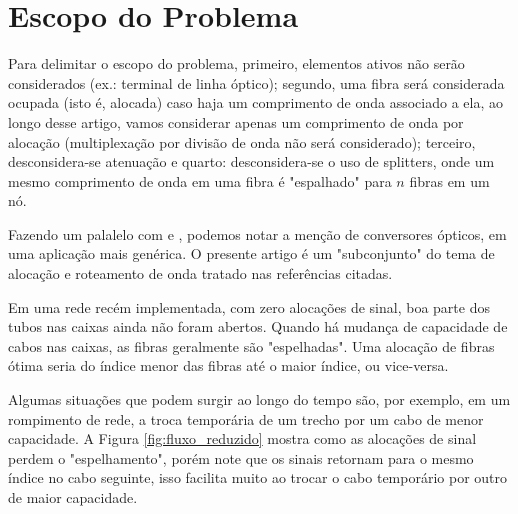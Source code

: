 \section{Escopo do Problema} \label{sec:problem}

Para delimitar o escopo do problema, primeiro, elementos ativos não serão
considerados (ex.: terminal de linha óptico); segundo, uma fibra será
considerada ocupada (isto é, alocada) caso haja um comprimento de onda
associado a ela, ao longo desse artigo, vamos considerar apenas um comprimento
de onda por alocação (multiplexação por divisão de onda não será considerado);
terceiro, desconsidera-se atenuação e quarto: desconsidera-se o uso de
splitters, onde um mesmo comprimento de onda em uma fibra é "espalhado" para
$n$ fibras em um nó.

Fazendo um palalelo com \cite{artigorwa} e \cite{zang2000review}, podemos notar
a menção de conversores ópticos, em uma aplicação mais genérica. O presente
artigo é um "subconjunto" do tema de alocação e roteamento de onda tratado nas
referências citadas.

Em uma rede recém implementada, com zero alocações de sinal, boa parte dos tubos 
nas caixas ainda não foram abertos. Quando há mudança de capacidade de cabos nas
caixas, as fibras geralmente são "espelhadas". Uma alocação de fibras ótima
seria do índice menor das fibras até o maior índice, ou vice-versa.

Algumas situações que podem surgir ao longo do tempo são, por exemplo, em um
rompimento de rede, a troca temporária de um trecho por um cabo de menor 
capacidade. A Figura \ref{fig:fluxo_reduzido} mostra como as alocações de sinal
perdem o "espelhamento", porém note que os sinais retornam para o mesmo índice
no cabo seguinte, isso facilita muito ao trocar o cabo temporário por outro de
maior capacidade.

